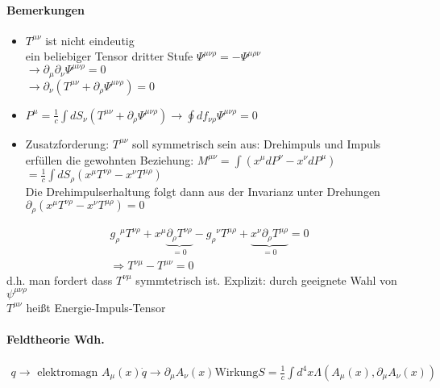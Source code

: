 \documentclass[a4paper]{article}
\begin{document}
\paragraph{Bemerkungen}
\begin{itemize}
  \item $T^{\mu\nu}$ ist nicht eindeutig \\ ein beliebiger Tensor dritter Stufe
  $\Psi^{\mu\nu\rho}=-\Psi^{\mu\rho\nu}$\\ $\rightarrow
  \partial_\mu\partial_\nu\Psi^{\mu\nu\rho}=0$\\$\rightarrow
  \partial_\nu(T^{\mu\nu}+\partial_\rho \Psi^{\mu\nu\rho} )=0$
  \item $P^\mu=\frac{1}{c}\int dS_\nu \left( T^{\mu\nu}+\partial_\rho
  \Psi^{\mu\nu\rho} \right)\rightarrow \oint df_{\nu\rho} \Psi^{\mu\nu\rho}=0 $
  \item Zusatzforderung: $T^{\mu\nu}$ soll symmetrisch sein aus: Drehimpuls und
  Impuls erfüllen die gewohnten Beziehung: $M^{\mu\nu}=\int\left( x^\mu
  dP^\nu-x^\nu dP^\mu \right)$\\$=\frac{1}{c}\int dS_\rho\left( x^\mu
  T^{\nu\rho}-x^\nu T^{\mu\rho} \right)$\\ Die Drehimpulserhaltung folgt dann
  aus der Invarianz unter Drehungen\\ $\partial_\rho\left( x^\mu
  T^{\nu\rho}-x^\nu T^{\mu\rho} \right)=0$
\end{itemize}
\begin{align}
g_\rho{}^\mu T^{\nu\rho}+x^\mu \underbrace{\partial_\rho
T^{\nu\rho}}_{=0}-g_\rho{}^\nu T^{\mu\rho}+\underbrace{x^\nu \partial_\rho
T^{\mu\rho}}_{=0}=0\\
\Rightarrow T^{\nu\mu}-T^{\mu\nu}=0
\end{align}
d.h. man fordert dass $T^{\nu\mu}$ symmtetrisch ist. Explizit: durch
geeignete Wahl von $\psi^{\mu\nu\rho}$ \\
$T^{\mu\nu}$ heißt Energie-Impuls-Tensor

\paragraph{Feldtheorie Wdh.}
\begin{align}
q\rightarrow \text{ elektromagn } A_\mu(x)
\dot{q} \rightarrow \partial_\mu A_\nu(x)
\text{Wirkung} S=\frac{1}{c}\int d^4x \Lambda(A_\mu(x),\partial_\mu
A_\nu(x))
\end{align}
\end{document}
